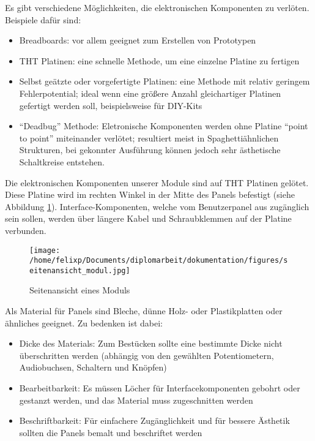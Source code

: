 \newpage

Es gibt verschiedene Möglichkeiten, die elektronischen Komponenten zu verlöten. Beispiele dafür sind:
\begin{itemize}
\item Breadboards:
vor allem geeignet zum Erstellen von Prototypen
\item \ac{THT} Platinen:
eine schnelle Methode, um eine einzelne Platine zu fertigen
\item Selbst geätzte oder vorgefertigte Platinen:
eine Methode mit relativ geringem Fehlerpotential; ideal wenn eine größere Anzahl gleichartiger Platinen gefertigt werden soll, beispielsweise für DIY-Kits
\item "`Deadbug"' Methode:
Eletronische Komponenten werden ohne Platine "`point to point"' miteinander verlötet; resultiert meist in Spaghettiähnlichen Strukturen, bei gekonnter Ausführung können jedoch sehr ästhetische Schaltkreise entstehen.
\end{itemize}

Die elektronischen Komponenten unserer Module sind auf \ac{THT} Platinen gelötet. Diese Platine wird im rechten Winkel in der Mitte des Panels befestigt (siehe Abbildung \ref{fig:orga3ef55f}). Interface-Komponenten, welche vom Benutzerpanel aus zugänglich sein sollen, werden über längere Kabel und Schraubklemmen auf der Platine verbunden.

\begin{figure}[hb]
\centering
\texttt{[image: /home/felixp/Documents/diplomarbeit/dokumentation/figures/seitenansicht\_modul.jpg]}
\caption{\label{fig:orga3ef55f}Seitenansicht eines Moduls}
\end{figure}

\newpage

Als Material für Panels sind Bleche, dünne Holz- oder Plastikplatten oder ähnliches geeignet. Zu bedenken ist dabei:

\begin{itemize}
\item Dicke des Materials:
Zum Bestücken sollte eine bestimmte Dicke nicht überschritten werden (abhängig von den gewählten Potentiometern, Audiobuchsen, Schaltern und Knöpfen)
\item Bearbeitbarkeit:
Es müssen Löcher für Interfacekomponenten gebohrt oder gestanzt werden, und das Material muss zugeschnitten werden
\item Beschriftbarkeit:
Für einfachere Zugänglichkeit und für bessere Ästhetik sollten die Panels bemalt und beschriftet werden
\end{itemize}

